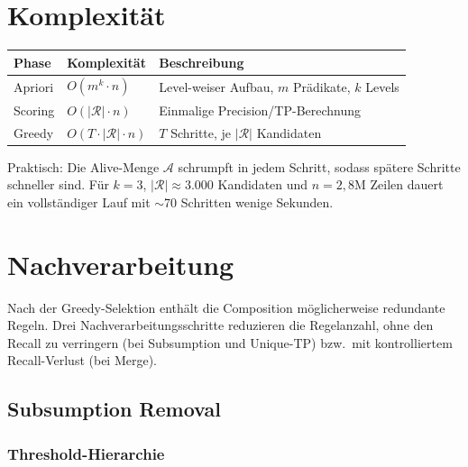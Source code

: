 \documentclass[11pt,a4paper]{article}
\begin{document}
\section{Komplexit\"at}

\renewcommand{\arraystretch}{1.3}
\begin{center}
\begin{tabular}{lll}
\toprule
Phase & Komplexit\"at & Beschreibung \\
\midrule
Apriori & $O(m^k \cdot n)$ & Level-weiser Aufbau, $m$ Pr\"adikate, $k$ Levels \\
Scoring & $O(|\mathcal{R}| \cdot n)$ & Einmalige Precision/TP-Berechnung \\
Greedy & $O(T \cdot |\mathcal{R}| \cdot n)$ & $T$ Schritte, je $|\mathcal{R}|$ Kandidaten \\
\bottomrule
\end{tabular}
\end{center}

\noindent Praktisch: Die Alive-Menge $\mathcal{A}$ schrumpft in jedem Schritt, sodass sp\"atere Schritte schneller sind. F\"ur $k=3$, $|\mathcal{R}| \approx 3{.}000$ Kandidaten und $n = 2{,}8$M Zeilen dauert ein vollst\"andiger Lauf mit $\sim$70 Schritten wenige Sekunden.

\section{Nachverarbeitung}

Nach der Greedy-Selektion enth\"alt die Composition m\"oglicherweise redundante Regeln. Drei Nachverarbeitungsschritte reduzieren die Regelanzahl, ohne den Recall zu verringern (bei Subsumption und Unique-TP) bzw.\ mit kontrolliertem Recall-Verlust (bei Merge).

\subsection{Subsumption Removal}

\subsubsection{Threshold-Hierarchie}
\end{document}
